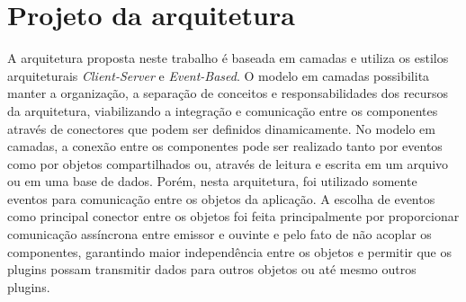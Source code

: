 \section{Projeto da arquitetura}
A arquitetura proposta neste trabalho é baseada em camadas e utiliza os estilos arquiteturais \textit{Client-Server} e \textit{Event-Based}. O modelo em camadas possibilita manter a organização, a separação de conceitos e responsabilidades dos recursos da arquitetura, viabilizando a integração e comunicação entre os componentes através de conectores que podem ser definidos dinamicamente. No modelo em camadas, a conexão entre os componentes pode ser realizado tanto por eventos como por objetos compartilhados ou, através de leitura e escrita em um arquivo ou em uma base de dados. Porém, nesta arquitetura, foi utilizado somente eventos para comunicação entre os objetos da aplicação. A escolha de eventos como principal conector entre os objetos foi feita principalmente por proporcionar comunicação assíncrona entre emissor e ouvinte e pelo fato de não acoplar os componentes, garantindo maior independência entre os objetos e permitir que os plugins possam transmitir dados para outros objetos ou até mesmo outros plugins.\par


